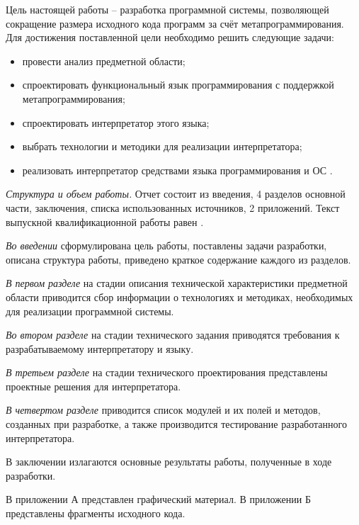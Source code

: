 Цель настоящей работы – разработка программной системы, позволяющей сокращение размера исходного кода программ за счёт метапрограммирования. Для достижения поставленной цели необходимо решить следующие задачи:
\begin{itemize}
	\item провести анализ предметной области;
	\item спроектировать функциональный язык программирования с поддержкой метапрограммирования;
	\item спроектировать интерпретатор этого языка;
	\item выбрать технологии и методики для реализации интерпретатора;
	\item реализовать интерпретатор средствами языка программирования  и ОС .
\end{itemize}

\emph{Структура и объем работы.} Отчет состоит из введения, 4 разделов основной части, заключения, списка использованных источников, 2 приложений. Текст выпускной квалификационной работы равен .

\emph{Во введении} сформулирована цель работы, поставлены задачи разработки, описана структура работы, приведено краткое содержание каждого из разделов.

\emph{В первом разделе} на стадии описания технической характеристики предметной области приводится сбор информации о технологиях и методиках, необходимых для реализации программной системы.

\emph{Во втором разделе} на стадии технического задания приводятся требования к разрабатываемому интерпретатору и языку.

\emph{В третьем разделе} на стадии технического проектирования представлены проектные решения для интерпретатора.

\emph{В четвертом разделе} приводится список модулей и их полей и методов, созданных при разработке, а также производится тестирование разработанного интерпретатора.

В заключении излагаются основные результаты работы, полученные в ходе разработки.

В приложении А представлен графический материал.
В приложении Б представлены фрагменты исходного кода. 
